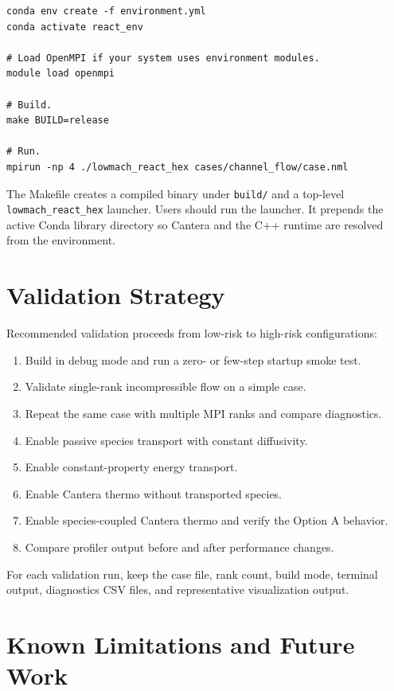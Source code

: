\documentclass[11pt]{article}
\begin{document}
\begin{lstlisting}[style=terminal]
conda env create -f environment.yml
conda activate react_env

# Load OpenMPI if your system uses environment modules.
module load openmpi

# Build.
make BUILD=release

# Run.
mpirun -np 4 ./lowmach_react_hex cases/channel_flow/case.nml
\end{lstlisting}

The Makefile creates a compiled binary under \texttt{build/} and a top-level
\texttt{lowmach\_react\_hex} launcher.  Users should run the launcher.  It
prepends the active Conda library directory so Cantera and the C++ runtime are
resolved from the environment.

\section{Validation Strategy}

Recommended validation proceeds from low-risk to high-risk configurations:
\begin{enumerate}[leftmargin=*]
  \item Build in debug mode and run a zero- or few-step startup smoke test.
  \item Validate single-rank incompressible flow on a simple case.
  \item Repeat the same case with multiple MPI ranks and compare diagnostics.
  \item Enable passive species transport with constant diffusivity.
  \item Enable constant-property energy transport.
  \item Enable Cantera thermo without transported species.
  \item Enable species-coupled Cantera thermo and verify the Option A behavior.
  \item Compare profiler output before and after performance changes.
\end{enumerate}

For each validation run, keep the case file, rank count, build mode, terminal
output, diagnostics CSV files, and representative visualization output.

\section{Known Limitations and Future Work}
\end{document}

